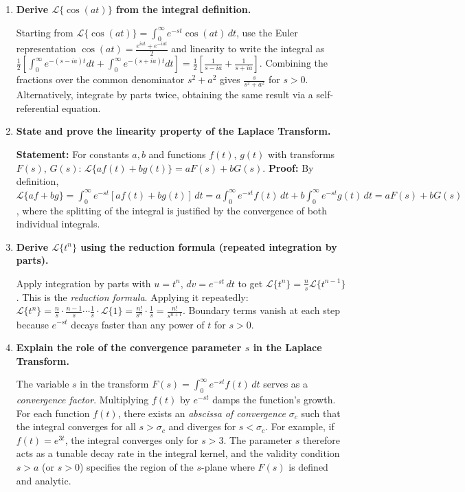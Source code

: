 \documentclass[12pt,a4paper]{article}
\begin{document}
\begin{enumerate}[leftmargin=1.5em, label=\textbf{D\arabic*.}]

\item \textbf{Derive $\mathcal{L}\{\cos(at)\}$ from the integral definition.}

Starting from $\mathcal{L}\{\cos(at)\} = \int_0^{\infty} e^{-st}\cos(at)\,dt$, use the Euler representation $\cos(at) = \frac{e^{iat}+e^{-iat}}{2}$ and linearity to write the integral as $\frac{1}{2}\left[\int_0^{\infty}e^{-(s-ia)t}dt + \int_0^{\infty}e^{-(s+ia)t}dt\right] = \frac{1}{2}\left[\frac{1}{s-ia}+\frac{1}{s+ia}\right]$. Combining the fractions over the common denominator $s^2+a^2$ gives $\frac{s}{s^2+a^2}$ for $s > 0$. Alternatively, integrate by parts twice, obtaining the same result via a self-referential equation.

\item \textbf{State and prove the linearity property of the Laplace Transform.}

\textbf{Statement:} For constants $a, b$ and functions $f(t)$, $g(t)$ with transforms $F(s)$, $G(s)$: $\mathcal{L}\{af(t)+bg(t)\} = aF(s)+bG(s)$. \textbf{Proof:} By definition, $\mathcal{L}\{af+bg\} = \int_0^{\infty}e^{-st}[af(t)+bg(t)]\,dt = a\int_0^{\infty}e^{-st}f(t)\,dt + b\int_0^{\infty}e^{-st}g(t)\,dt = aF(s)+bG(s)$, where the splitting of the integral is justified by the convergence of both individual integrals.

\item \textbf{Derive $\mathcal{L}\{t^n\}$ using the reduction formula (repeated integration by parts).}

Apply integration by parts with $u = t^n$, $dv = e^{-st}\,dt$ to get $\mathcal{L}\{t^n\} = \frac{n}{s}\mathcal{L}\{t^{n-1}\}$. This is the \emph{reduction formula}. Applying it repeatedly: $\mathcal{L}\{t^n\} = \frac{n}{s}\cdot\frac{n-1}{s}\cdots\frac{1}{s}\cdot\mathcal{L}\{1\} = \frac{n!}{s^n}\cdot\frac{1}{s} = \frac{n!}{s^{n+1}}$. Boundary terms vanish at each step because $e^{-st}$ decays faster than any power of $t$ for $s > 0$.

\item \textbf{Explain the role of the convergence parameter $s$ in the Laplace Transform.}

The variable $s$ in the transform $F(s) = \int_0^{\infty}e^{-st}f(t)\,dt$ serves as a \emph{convergence factor}. Multiplying $f(t)$ by $e^{-st}$ damps the function's growth. For each function $f(t)$, there exists an \emph{abscissa of convergence} $\sigma_c$ such that the integral converges for all $s > \sigma_c$ and diverges for $s < \sigma_c$. For example, if $f(t) = e^{3t}$, the integral converges only for $s > 3$. The parameter $s$ therefore acts as a tunable decay rate in the integral kernel, and the validity condition $s > a$ (or $s > 0$) specifies the region of the $s$-plane where $F(s)$ is defined and analytic.


\end{enumerate}
\end{document}
